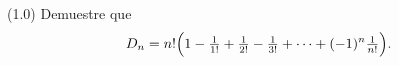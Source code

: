 (1.0) Demuestre que
\[ D_n = n!\Bigl(1-\tfrac1{1!}+\tfrac1{2!}-\tfrac1{3!}+\cdots+(-1)^n\tfrac1{n!}\Bigr). \]
